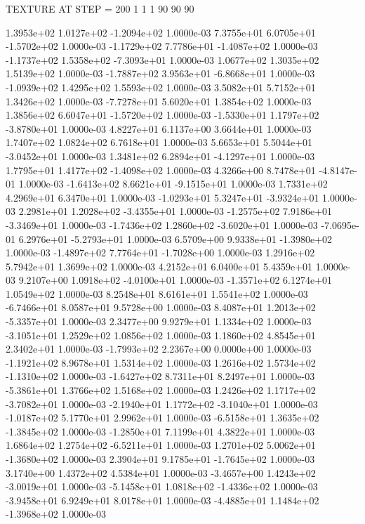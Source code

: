 TEXTURE AT STEP = 200
1 1 1
90 90 90

 1.3953e+02  1.0127e+02 -1.2094e+02  1.0000e-03
 7.3755e+01  6.0705e+01 -1.5702e+02  1.0000e-03
-1.1729e+02  7.7786e+01 -1.4087e+02  1.0000e-03
-1.1737e+02  1.5358e+02 -7.3093e+01  1.0000e-03
1.0677e+02 1.3035e+02 1.5139e+02  1.0000e-03
-1.7887e+02  3.9563e+01 -6.8668e+01  1.0000e-03
-1.0939e+02  1.4295e+02  1.5593e+02  1.0000e-03
3.5082e+01 5.7152e+01 1.3426e+02  1.0000e-03
-7.7278e+01  5.6020e+01  1.3854e+02  1.0000e-03
 1.3856e+02  6.6047e+01 -1.5720e+02  1.0000e-03
-1.5330e+01  1.1797e+02 -3.8780e+01  1.0000e-03
4.8227e+01 6.1137e+00 3.6644e+01  1.0000e-03
1.7407e+02 1.0824e+02 6.7618e+01  1.0000e-03
 5.6653e+01  5.5044e+01 -3.0452e+01  1.0000e-03
 1.3481e+02  6.2894e+01 -4.1297e+01  1.0000e-03
 1.7795e+01  1.4177e+02 -1.4098e+02  1.0000e-03
 4.3266e+00  8.7478e+01 -4.8147e-01  1.0000e-03
-1.6413e+02  8.6621e+01 -9.1515e+01  1.0000e-03
1.7331e+02 4.2969e+01 6.3470e+01  1.0000e-03
-1.0293e+01  5.3247e+01 -3.9324e+01  1.0000e-03
 2.2981e+01  1.2028e+02 -3.4355e+01  1.0000e-03
-1.2575e+02  7.9186e+01 -3.3469e+01  1.0000e-03
-1.7436e+02  1.2860e+02 -3.6020e+01  1.0000e-03
-7.0695e-01  6.2976e+01 -5.2793e+01  1.0000e-03
 6.5709e+00  9.9338e+01 -1.3980e+02  1.0000e-03
-1.4897e+02  7.7764e+01 -1.7028e+00  1.0000e-03
1.2916e+02 5.7942e+01 1.3699e+02  1.0000e-03
4.2152e+01 6.0400e+01 5.4359e+01  1.0000e-03
 9.2107e+00  1.0918e+02 -4.0100e+01  1.0000e-03
-1.3571e+02  6.1274e+01  1.0549e+02  1.0000e-03
8.2548e+01 8.6161e+01 1.5541e+02  1.0000e-03
-6.7466e+01  8.0587e+01  9.5728e+00  1.0000e-03
 8.4087e+01  1.2013e+02 -5.3357e+01  1.0000e-03
2.3477e+00 9.9279e+01 1.1334e+02  1.0000e-03
-3.1051e+01  1.2529e+02  1.0856e+02  1.0000e-03
1.1860e+02 4.8545e+01 2.3402e+01  1.0000e-03
-1.7993e+02  2.2367e+00  0.0000e+00  1.0000e-03
-1.1921e+02  8.9678e+01  1.5314e+02  1.0000e-03
 1.2616e+02  1.5734e+02 -1.1310e+02  1.0000e-03
-1.6427e+02  8.7311e+01  8.2497e+01  1.0000e-03
-5.3861e+01  1.3766e+02  1.5168e+02  1.0000e-03
 1.2426e+02  1.1717e+02 -3.7082e+01  1.0000e-03
-2.1940e+01  1.1772e+02 -3.1040e+01  1.0000e-03
-1.0187e+02  5.1770e+01  2.9962e+01  1.0000e-03
-6.5158e+01  1.3635e+02 -1.3845e+02  1.0000e-03
-1.2850e+01  7.1199e+01  4.3822e+01  1.0000e-03
 1.6864e+02  1.2754e+02 -6.5211e+01  1.0000e-03
 1.2701e+02  5.0062e+01 -1.3680e+02  1.0000e-03
 2.3904e+01  9.1785e+01 -1.7645e+02  1.0000e-03
3.1740e+00 1.4372e+02 4.5384e+01  1.0000e-03
-3.4657e+00  1.4243e+02 -3.0019e+01  1.0000e-03
-5.1458e+01  1.0818e+02 -1.4336e+02  1.0000e-03
-3.9458e+01  6.9249e+01  8.0178e+01  1.0000e-03
-4.4885e+01  1.1484e+02 -1.3968e+02  1.0000e-03
